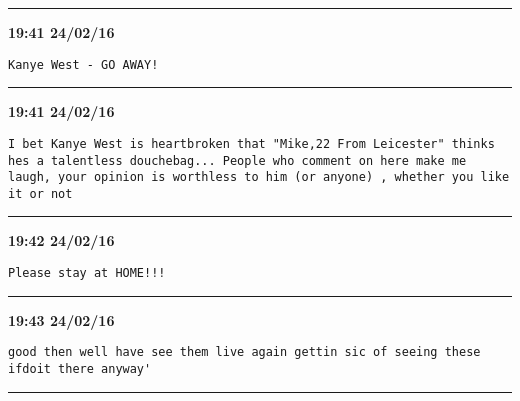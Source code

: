 \hrule%

\begin{adjustwidth}{0cm}{0cm}
\footnotesize \textbf{19:41 24/02/16}

\begin{lstlisting}[breaklines, breakatwhitespace, basicstyle=\small, frame=leftline]
Kanye West - GO AWAY!
\end{lstlisting}
\end{adjustwidth}

\hrule%

\begin{adjustwidth}{0cm}{0cm}
\footnotesize \textbf{19:41 24/02/16}

\begin{lstlisting}[breaklines, breakatwhitespace, basicstyle=\small, frame=leftline]
I bet Kanye West is heartbroken that "Mike,22 From Leicester" thinks hes a talentless douchebag... People who comment on here make me laugh, your opinion is worthless to him (or anyone) , whether you like it or not
\end{lstlisting}
\end{adjustwidth}

\hrule%

\begin{adjustwidth}{0cm}{0cm}
\footnotesize \textbf{19:42 24/02/16}

\begin{lstlisting}[breaklines, breakatwhitespace, basicstyle=\small, frame=leftline]
Please stay at HOME!!!
\end{lstlisting}
\end{adjustwidth}

\hrule%

\begin{adjustwidth}{0cm}{0cm}
\footnotesize \textbf{19:43 24/02/16}

\begin{lstlisting}[breaklines, breakatwhitespace, basicstyle=\small, frame=leftline]
good then well have see them live again gettin sic of seeing these ifdoit there anyway'
\end{lstlisting}
\end{adjustwidth}

\hrule%

